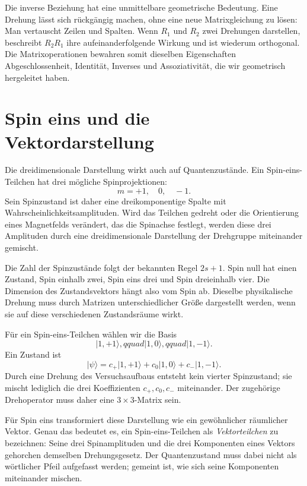 Die inverse Beziehung hat eine unmittelbare geometrische Bedeutung. Eine Drehung lässt sich rückgängig machen, ohne eine neue Matrixgleichung zu lösen: Man vertauscht Zeilen und Spalten. Wenn \(R_1\) und \(R_2\) zwei Drehungen darstellen, beschreibt \(R_2R_1\) ihre aufeinanderfolgende Wirkung und ist wiederum orthogonal. Die Matrixoperationen bewahren somit dieselben Eigenschaften Abgeschlossenheit, Identität, Inverses und Assoziativität, die wir geometrisch hergeleitet haben.

\section{Spin eins und die Vektordarstellung}

Die dreidimensionale Darstellung wirkt auch auf Quantenzustände. Ein Spin-eins-Teilchen hat drei mögliche Spinprojektionen:
\begin{equation}
m=+1,\quad 0,\quad -1.
\end{equation}
Sein Spinzustand ist daher eine dreikomponentige Spalte mit Wahrscheinlichkeitsamplituden. Wird das Teilchen gedreht oder die Orientierung eines Magnetfelds verändert, das die Spinachse festlegt, werden diese drei Amplituden durch eine dreidimensionale Darstellung der Drehgruppe miteinander gemischt.

Die Zahl der Spinzustände folgt der bekannten Regel \(2s+1\). Spin null hat einen Zustand, Spin einhalb zwei, Spin eins drei und Spin dreieinhalb vier. Die Dimension des Zustandsvektors hängt also vom Spin ab. Dieselbe physikalische Drehung muss durch Matrizen unterschiedlicher Größe dargestellt werden, wenn sie auf diese verschiedenen Zustandsräume wirkt.

Für ein Spin-eins-Teilchen wählen wir die Basis
\begin{equation}
\lvert 1,+1\rangle,qquad
\lvert 1,0\rangle,qquad
\lvert 1,-1\rangle.
\end{equation}
Ein Zustand ist
\begin{equation}
\lvert\psi\rangle
=c_{+}\lvert1,+1\rangle+c_0\lvert1,0\rangle+c_{-}\lvert1,-1\rangle.
\end{equation}
Durch eine Drehung des Versuchsaufbaus entsteht kein vierter Spinzustand; sie mischt lediglich die drei Koeffizienten \(c_+,c_0,c_-\) miteinander. Der zugehörige Drehoperator muss daher eine \(3\times3\)-Matrix sein.

Für Spin eins transformiert diese Darstellung wie ein gewöhnlicher räumlicher Vektor. Genau das bedeutet es, ein Spin-eins-Teilchen als \emph{Vektorteilchen} zu bezeichnen: Seine drei Spinamplituden und die drei Komponenten eines Vektors gehorchen demselben Drehungsgesetz. Der Quantenzustand muss dabei nicht als wörtlicher Pfeil aufgefasst werden; gemeint ist, wie sich seine Komponenten miteinander mischen.

